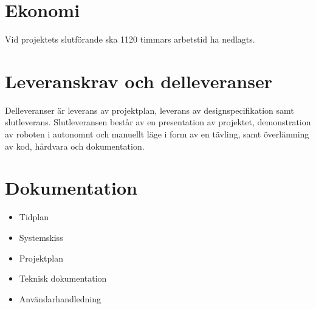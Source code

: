 \documentclass[a4paper,titlepage,12pt]{article}
\begin{document}
	\section{Ekonomi}
	Vid projektets slutförande ska 1120 timmars arbetstid ha nedlagts.

	\section{Leveranskrav och delleveranser}
	Delleveranser är leverans av projektplan, leverans av designspecifikation 
	samt slutleverans. Slutleveransen består av en presentation av projektet, 
	demonstration av roboten i autonomnt och manuellt läge i form av en tävling,
	samt överlämning av kod, hårdvara och dokumentation.
	
	\section{Dokumentation}
    \begin{itemize}
		\item Tidplan 
		\item Systemskiss 
		\item Projektplan
		\item Teknisk dokumentation 
		\item Användarhandledning 
    \end{itemize}
\end{document}
